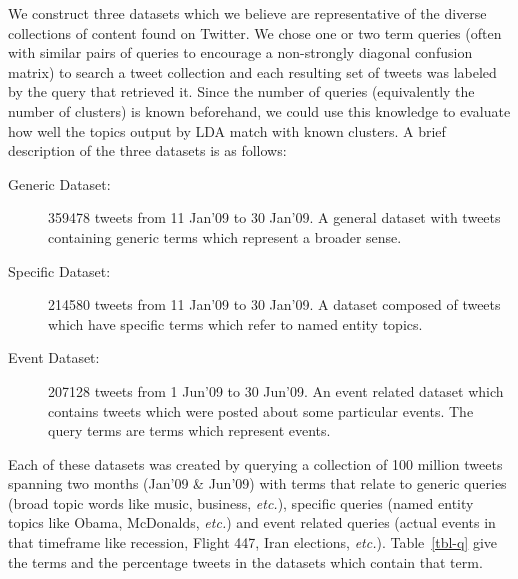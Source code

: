 \documentclass[10pt,a5paper,twoside]{article}
\begin{document}
We construct three datasets which we believe are representative of the
diverse collections of content found on Twitter.  We chose one or
two term queries (often with similar pairs of queries to encourage
a non-strongly diagonal confusion matrix) to search a tweet
collection and each resulting set of tweets was labeled by the query
that retrieved it.  Since the number of queries (equivalently the
number of clusters) is known beforehand, we could use this knowledge
to evaluate how well the topics output by LDA match with known
clusters. A brief description of the three datasets is as
follows:\vspace{-5pt}
\begin{description}
\item[Generic Dataset: ]
 359478 tweets from 11 Jan'09 to 30 Jan'09.
A general dataset with tweets containing generic terms which represent a broader sense.\vspace{-5pt}
\item[Specific Dataset: ]
214580 tweets from 11 Jan'09 to 30 Jan'09.
A dataset composed of tweets which have specific terms which refer to named entity topics.\vspace{-5pt}
\item[Event Dataset: ]
207128 tweets from 1 Jun'09 to 30 Jun'09.
An event related dataset which contains tweets which were posted about some particular events. The query terms are terms which represent events.\vspace{-5pt}
\end{description}
Each of these datasets was created by querying a collection of 100
million tweets spanning two months (Jan'09 \& Jun'09) with terms
that relate to generic queries (broad topic words like music,
business, {\it etc.}), specific queries (named entity topics like
Obama, McDonalds, {\it etc.}) and event related queries (actual events
in that timeframe like recession, Flight 447, Iran elections, {\it
  etc.}).  Table~\ref{tbl-q} give the terms and the percentage tweets
in the datasets which contain that term.
\end{document}
